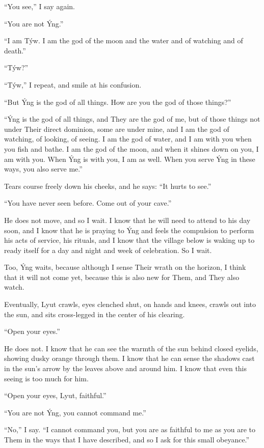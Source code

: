 ``You see,'' I say again.

``You are not Ýng.''

``I am Týw. I am the god of the moon and the water and of watching and of death.''

``Týw?''

``Týw,'' I repeat, and smile at his confusion.

``But Ýng is the god of all things. How are you the god of those things?''

``Ýng is the god of all things, and They are the god of me, but of those things not under Their direct dominion, some are under mine, and I am the god of watching, of looking, of seeing. I am the god of water, and I am with you when you fish and bathe. I am the god of the moon, and when it shines down on you, I am with you. When Ýng is with you, I am as well. When you serve Ýng in these ways, you also serve me.''

Tears course freely down his cheeks, and he says: ``It hurts to see.''

``You have never seen before. Come out of your cave.''

He does not move, and so I wait. I know that he will need to attend to his day soon, and I know that he is praying to Ýng and feels the compulsion to perform his acts of service, his rituals, and I know that the village below is waking up to ready itself for a day and night and week of celebration. So I wait.

Too, Ýng waits, because although I sense Their wrath on the horizon, I think that it will not come yet, because this is also new for Them, and They also watch.

Eventually, Lyut crawls, eyes clenched shut, on hands and knees, crawls out into the sun, and sits cross-legged in the center of his clearing.

``Open your eyes.''

He does not. I know that he can see the warmth of the sun behind closed eyelids, showing dusky orange through them. I know that he can sense the shadows cast in the sun's arrow by the leaves above and around him. I know that even this seeing is too much for him.

``Open your eyes, Lyut, faithful.''

``You are not Ýng, you cannot command me.''

``No,'' I say. ``I cannot command you, but you are as faithful to me as you are to Them in the ways that I have described, and so I ask for this small obeyance.''

